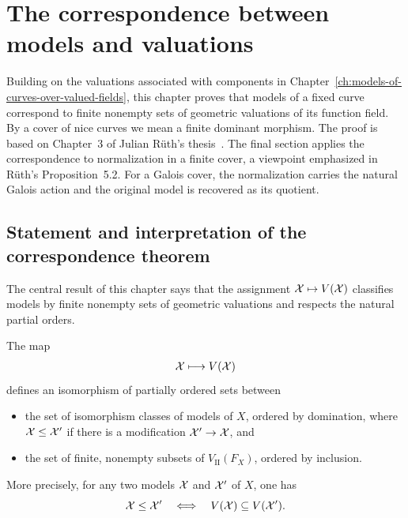 \chapter{The correspondence between models and valuations}\label{ch:correspondence-between-models-and-valuations}

Building on the valuations associated with components in Chapter~\ref{ch:models-of-curves-over-valued-fields}, this chapter proves that models of a fixed curve correspond to finite nonempty sets of geometric valuations of its function field.
By a cover of nice curves we mean a finite dominant morphism.
The proof is based on Chapter~3 of Julian Rüth's thesis~\cite{Rueth}.
The final section applies the correspondence to normalization in a finite cover, a viewpoint emphasized in Rüth's Proposition~5.2.
For a Galois cover, the normalization carries the natural Galois action and the original model is recovered as its quotient.

\section{Statement and interpretation of the correspondence theorem}\label{sec:statement-correspondence-theorem}

The central result of this chapter says that the assignment $\mathcal X\mapsto V(\mathcal X)$ classifies models by finite nonempty sets of geometric valuations and respects the natural partial orders.

\begin{theorem}\label{thm:bijectionModelsAndComponents}
    The map
    \begin{align} \label{eq:mapFromModelToValuation}
        \mathcal X \longmapsto V(\mathcal X)
    \end{align}
    defines an isomorphism of partially ordered sets between
    \begin{itemize}
        \item the set of isomorphism classes of models of $X$, ordered by domination, where $\mathcal X\leq\mathcal X'$ if there is a modification $\mathcal X'\to\mathcal X$, and
        \item the set of finite, nonempty subsets of $V_\textrm{II}(F_X)$, ordered by inclusion.
    \end{itemize}
    More precisely, for any two models $\mathcal X$ and $\mathcal X'$ of $X$, one has
    \[
        \mathcal X\leq\mathcal X'
        \quad\Longleftrightarrow\quad
        V(\mathcal X)\subseteq V(\mathcal X').
    \]
\end{theorem}

